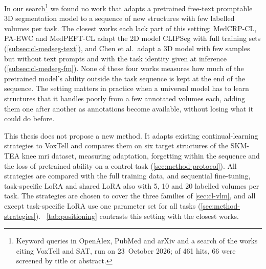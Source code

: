 In our search\footnote{Keyword queries in OpenAlex, PubMed and arXiv and a search of the works citing VoxTell and SAT, run on 23~October 2026; of 461 hits, 66 were screened by title or abstract.} we found no work that adapts a pretrained free-text promptable 3D segmentation model to a sequence of new structures with few labelled volumes per task.
The closest works each lack part of this setting: MedCRP-CL, PA-EWC and MedPEFT-CL adapt the 2D model CLIPSeg with full training sets (\cref{subsec:cl-medseg-text}), and Chen et al.\ adapt a 3D model with few samples but without text prompts and with the task identity given at inference (\cref{subsec:cl-medseg-fm}).
None of these four works measures how much of the pretrained model's ability outside the task sequence is kept at the end of the sequence.
The setting matters in practice when a universal model has to learn structures that it handles poorly from a few annotated volumes each, adding them one after another as annotations become available, without losing what it could do before.

This thesis does not propose a new method.
It adapts existing continual-learning strategies to VoxTell and compares them on six target structures of the SKM-TEA knee \gls{mri} dataset, measuring adaptation, forgetting within the sequence and the loss of pretrained ability on a control task (\cref{sec:method-protocol}).
All strategies are compared with the full training data, and sequential fine-tuning, task-specific LoRA and shared LoRA also with 5, 10 and 20 labelled volumes per task.
The strategies are chosen to cover the three families of \cref{sec:cl-vlm}, and all except task-specific LoRA use one parameter set for all tasks (\cref{sec:method-strategies}).
\tablename~\ref{tab:positioning} contrasts this setting with the closest works.



